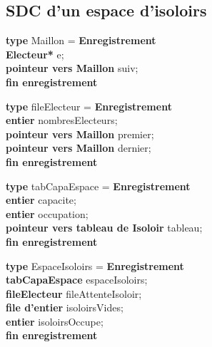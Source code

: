 \documentclass[12pt]{article} %
\begin{document}
\subsection*{SDC d'un espace d'isoloirs}

\begin{flushleft}
	\begin{minipage}[t]{0.5\textwidth}
	\textbf{type} Maillon = \textbf{Enregistrement}\\
	\hspace*{1em} \textbf{Electeur*} e;\\
	\hspace*{1em} \textbf{pointeur vers Maillon} suiv;\\ 
	\textbf{fin enregistrement}
	\end{minipage}%
	\hfill
	\begin{minipage}[t]{0.5\textwidth}
		\textbf{type} fileElecteur = \textbf{Enregistrement}\\
		\hspace*{1em} \textbf{entier} nombresElecteurs;\\
		\hspace*{1em} \textbf{pointeur vers Maillon} premier;\\
		\hspace*{1em} \textbf{pointeur vers Maillon} dernier;\\ 
		\textbf{fin enregistrement}
	\end{minipage}
\end{flushleft}

\begin{flushleft}
	\begin{minipage}[t]{0.5\textwidth}
		\textbf{type} tabCapaEspace = \textbf{Enregistrement}\\
		\hspace*{1em} \textbf{entier} capacite;\\
		\hspace*{1em} \textbf{entier} occupation;\\
		\hspace*{1em} \textbf{pointeur vers tableau de Isoloir} tableau;\\ 
		\textbf{fin enregistrement}
	\end{minipage}%
	\hfill
	\begin{minipage}[t]{0.5\textwidth}
		\textbf{type} EspaceIsoloirs = \textbf{Enregistrement}\\
		\hspace*{1em} \textbf{tabCapaEspace} espaceIsoloirs;\\
		\hspace*{1em} \textbf{fileElecteur} fileAttenteIsoloir;\\
		\hspace*{1em} \textbf{file d'entier} isoloirsVides;\\
		\hspace*{1em} \textbf{entier} isoloirsOccupe;\\ 
		\textbf{fin enregistrement}
	\end{minipage}
\end{flushleft}
\end{document}
